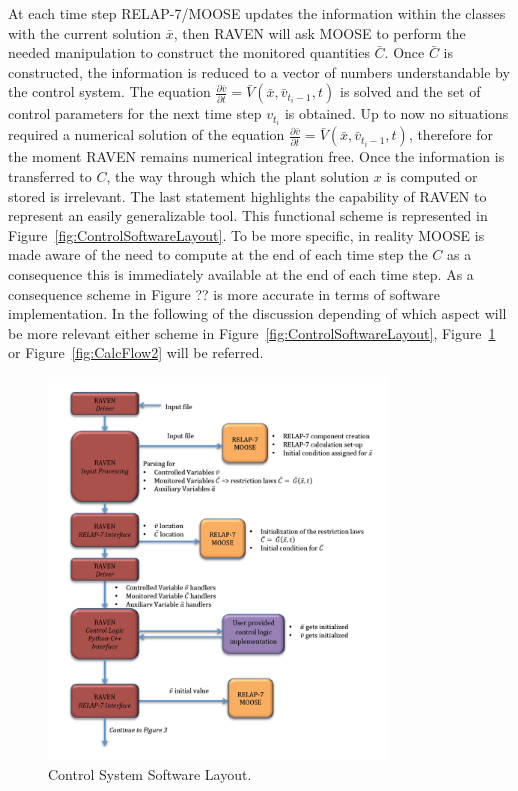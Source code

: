 \documentclass{mc2013}
\begin{document}
\label{sec:swLayoutCalcFlow}
At each time step RELAP-7/MOOSE updates the information within the classes with the current solution  $\bar{x}$, then RAVEN will ask MOOSE to perform the needed manipulation to construct the monitored quantities $\bar{C}$. Once $\bar{C}$ is constructed, the information is reduced to a vector of
numbers understandable by the control system. 
The equation 
$\frac{\partial \bar{v}}{\partial t} = \bar{V}(\bar{x},\bar{v}_{t_{i}-1},t) $
is solved and the set of control parameters for the next time step $v_{t_{i}}$ is obtained. 
Up to now no situations required a numerical solution of the equation 
$\frac{\partial \bar{v}}{\partial t} = \bar{V}(\bar{x},\bar{v}_{t_{i}-1},t) $, therefore for the moment RAVEN remains numerical integration free. 
Once the information is transferred to $C$, the way through which the plant
solution $x$ is computed or stored is irrelevant. The last statement highlights the capability of RAVEN to
represent an easily generalizable tool. This functional scheme is represented in Figure~\ref{fig:ControlSoftwareLayout}.
To be more specific, in reality MOOSE is made aware of the need to compute at the end of each time step the $C$ as a consequence this is immediately available at the end of each time step. As a consequence scheme in Figure ?? is more accurate in terms of software implementation. In the following of the discussion depending of which aspect will be more relevant either scheme in Figure~\ref{fig:ControlSoftwareLayout}, Figure~\ref{fig:CalcFlow1} or Figure~\ref{fig:CalcFlow2} will be referred.

\begin{figure}[h] 
  \centering
     \includegraphics[width=0.8\textwidth]{figures/CalculationFlow_part_1.PNG}
  \caption{Control System Software Layout.}
  \label{fig:CalcFlow1}
\end{figure}
\end{document}
